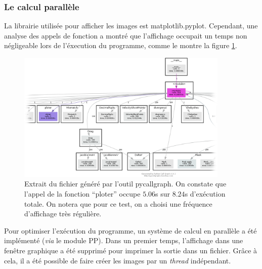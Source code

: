 \subsubsection{Le calcul parallèle}
        La librairie utilisée pour afficher les images est
matplotlib.pyplot. Cependant, une analyse des appels de fonction a
montré que l'affichage occupait un temps non négligeable lors de
l'éxecution du programme, comme le montre la figure \ref{call}.
\begin{figure}
  \begin{center}
    \includegraphics[width=0.9\textwidth]{pycallgraph.png}
    \caption{Extrait du fichier généré par l'outil pycallgraph. On
      constate que l'appel de la fonction ``ploter'' occupe $5.06$s
      sur $8.24$s d'exécution totale. On notera que pour ce test, on a
      choisi une fréquence d'affichage très régulière.}
    \label{call}
  \end{center}
\end{figure}
Pour optimiser l'exécution du programme, un système de calcul en
parallèle a été implémenté (\emph{via} le module PP). Dans un premier
temps, l'affichage dans une fenêtre graphique a été supprimé pour
imprimer la sortie dans un fichier. Grâce à cela, il a été possible de
faire créer les images par un \emph{thread} indépendant.

